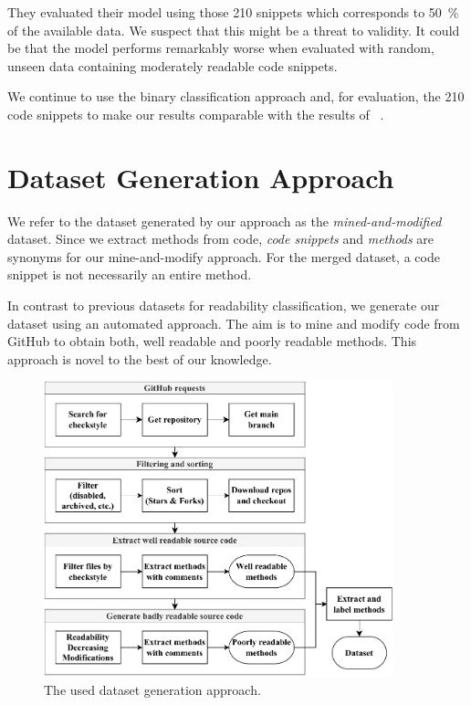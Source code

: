 \documentclass[%
class=scrreprt,
chapterprefix=false,%
open=right,%
twoside=true,%
paper=a4,%
logofile={Logo\_zentral\_farbig\_EN.png},%
thesistype=master,%
UKenglish,%
]{se2thesis}
\theoremstyle{definition}
\begin{document}
	They evaluated their model using those 210 snippets which corresponds to 50~\% of the available data. We suspect that this might be a threat to validity. It could be that the model performs remarkably worse when evaluated with random, unseen data containing moderately readable code snippets.
	
	We continue to use the binary classification approach and, for evaluation, the 210 code snippets to make our results comparable with the results of \citeauthor{mi2022towards}~\cite{mi2022towards}.
	
\section{Dataset Generation Approach} \label{Dataset Generation Approach}
	We refer to the dataset generated by our approach as the \textit{mined-and-modified} dataset.
	Since we extract methods from code, \textit{code snippets} and \textit{methods} are synonyms for our mine-and-modify approach. For the merged dataset, a code snippet is not necessarily an entire method.

	In contrast to previous datasets for readability classification, we generate our dataset using an automated approach. The aim is to mine and modify code from GitHub to obtain both, well readable and poorly readable methods. This approach is novel to the best of our knowledge. 
	
	\begin{figure}[tb]
		\centering
		\includegraphics[width=0.9\textwidth]{img/dataset_generation.pdf}
		\caption{The used dataset generation approach.}
		\label{fig:dataset_generation}
	\end{figure}
	
\end{document}
